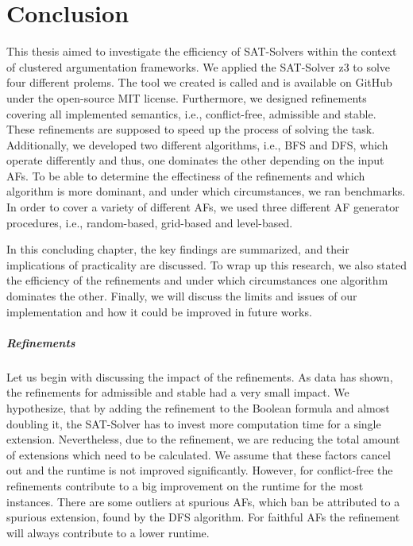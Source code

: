 \chapter{Conclusion}
This thesis aimed to investigate the efficiency of SAT-Solvers within the context of clustered argumentation frameworks. We applied the SAT-Solver z3 to solve four different prolems. The tool we created is called \prog and is available on GitHub under the open-source MIT license. Furthermore, we designed refinements covering all implemented semantics, i.e., conflict-free, admissible and stable. These refinements are supposed to speed up the process of solving the task. Additionally, we developed two different algorithms, i.e., BFS and DFS, which operate differently and thus, one dominates the other depending on the input AFs. To be able to determine the effectiness of the refinements and which algorithm is more dominant, and under which circumstances, we ran benchmarks. In order to cover a variety of different AFs, we used three different AF generator procedures, i.e., random-based, grid-based and level-based.

In this concluding chapter, the key findings are summarized, and their implications of practicality are discussed. To wrap up this research, we also stated the efficiency of the refinements and under which circumstances one algorithm dominates the other. Finally, we will discuss the limits and issues of our implementation and how it could be improved in future works.

\paragraph{Refinements} Let us begin with discussing the impact of the refinements. As data has shown, the refinements for admissible and stable had a very small impact. We hypothesize, that by adding the refinement to the Boolean formula and almost doubling it, the SAT-Solver has to invest more computation time for a single extension. Nevertheless, due to the refinement, we are reducing the total amount of extensions which need to be calculated. We assume that these factors cancel out and the runtime is not improved significantly. However, for conflict-free the refinements contribute to a big improvement on the runtime for the most instances. There are some outliers at spurious AFs, which ban be attributed to a spurious extension, found by the DFS algorithm. For faithful AFs the refinement will always contribute to a lower runtime.



